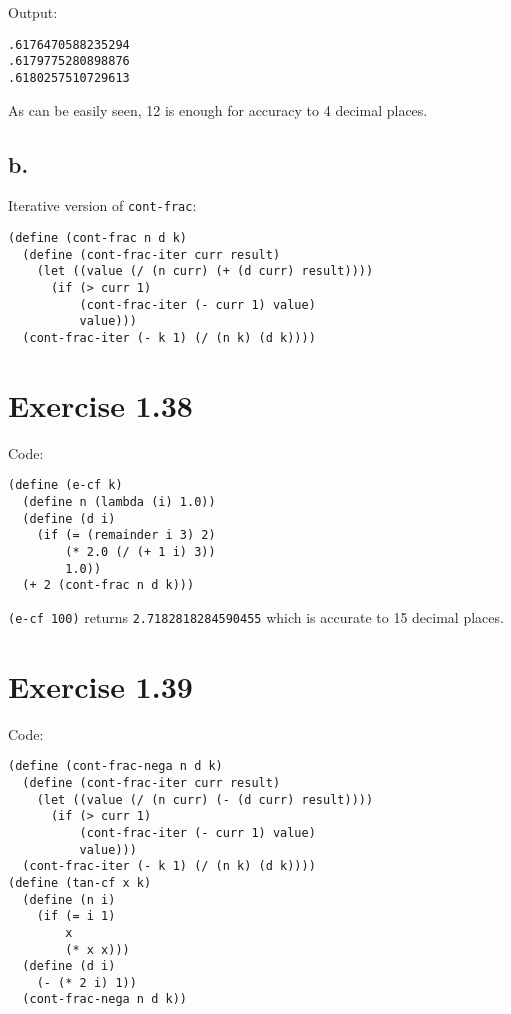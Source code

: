 \documentclass[../main.tex]{subfiles}
\begin{document}
Output:

\begin{lstlisting}
.6176470588235294
.6179775280898876
.6180257510729613
\end{lstlisting}

As can be easily seen, 12 is enough for accuracy to 4 decimal places.

\subsection*{b.}

Iterative version of \lstinline{cont-frac}:

\begin{lstlisting}
(define (cont-frac n d k)
  (define (cont-frac-iter curr result)
    (let ((value (/ (n curr) (+ (d curr) result))))
      (if (> curr 1)
          (cont-frac-iter (- curr 1) value)
          value)))
  (cont-frac-iter (- k 1) (/ (n k) (d k))))
\end{lstlisting}

\section{Exercise 1.38}

Code:

\begin{lstlisting}
(define (e-cf k)
  (define n (lambda (i) 1.0))
  (define (d i)
    (if (= (remainder i 3) 2)
        (* 2.0 (/ (+ 1 i) 3))
        1.0))
  (+ 2 (cont-frac n d k)))
\end{lstlisting}

\lstinline{(e-cf 100)} returns \lstinline{2.7182818284590455} which is
 accurate to 15 decimal places.

\section{Exercise 1.39}

Code:

\begin{lstlisting}
(define (cont-frac-nega n d k)
  (define (cont-frac-iter curr result)
    (let ((value (/ (n curr) (- (d curr) result))))
      (if (> curr 1)
          (cont-frac-iter (- curr 1) value)
          value)))
  (cont-frac-iter (- k 1) (/ (n k) (d k))))
(define (tan-cf x k)
  (define (n i)
    (if (= i 1)
        x
        (* x x)))
  (define (d i)
    (- (* 2 i) 1))
  (cont-frac-nega n d k))
\end{lstlisting}
\end{document}
